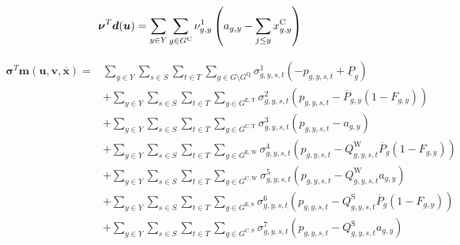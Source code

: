 \documentclass{article}
\newcommand{\sGenerators}{G}
\newcommand{\sGeneratorsExistingThermal}{G^{\mathrm{E,T}}}
\newcommand{\sGeneratorsExistingWind}{G^{\mathrm{E,W}}}
\newcommand{\sGeneratorsExistingSolar}{G^{\mathrm{E,S}}}
\newcommand{\sGeneratorsCandidate}{G^{\mathrm{C}}}
\newcommand{\sGeneratorsCandidateThermal}{G^{\mathrm{C,T}}}
\newcommand{\sGeneratorsCandidateWind}{G^{\mathrm{C,W}}}
\newcommand{\sGeneratorsCandidateSolar}{G^{\mathrm{C,S}}}
\newcommand{\sStorage}{G^{\mathrm{Q}}}
\newcommand{\sYears}{Y}
\newcommand{\sScenarios}{S}
\newcommand{\sIntervals}{T}
\newcommand{\iGenerator}{g}
\newcommand{\iYear}{y}
\newcommand{\iYearAlias}{j}
\newcommand{\iScenario}{s}
\newcommand{\iInterval}{t}
\newcommand{\cPowerOutputMax}[1][\iGenerator,\iYear]{\overline{P}_{#1}}
\newcommand{\cPowerOutputMin}[1][\iGenerator]{\underline{P}_{#1}}
\newcommand{\cCapacityFactorWind}[1][\iGenerator,\iYear,\iScenario,\iInterval]{Q_{#1}^{\mathrm{W}}}
\newcommand{\cCapacityFactorSolar}[1][\iGenerator,\iYear,\iScenario,\iInterval]{Q_{#1}^{\mathrm{S}}}
\newcommand{\cRetirementIndicator}[1][\iGenerator,\iYear]{F_{#1}}
\newcommand{\vInstalledCapacity}[1][\iGenerator,\iYear]{x^{\mathrm{C}}_{#1}}
\newcommand{\vPower}[1][\iGenerator,\iYear,\iScenario,\iInterval]{p_{#1}}
\newcommand{\vInstalledCapacityTotal}[1][\iGenerator,\iYear]{a_{#1}}
\newcommand{\dTotalInstallCapacity}[1][\iGenerator,\iYear]{\nu_{#1}^{1}}
\newcommand{\dMinPowerOutput}[1][\iGenerator,\iYear,\iScenario,\iInterval]{\sigma_{#1}^{1}}
\newcommand{\dMaxPowerOutputExistingThermal}[1][\iGenerator,\iYear,\iScenario,\iInterval]{\sigma_{#1}^{2}}
\newcommand{\dMaxPowerOutputCandidateThermal}[1][\iGenerator,\iYear,\iScenario,\iInterval]{\sigma_{#1}^{3}}
\newcommand{\dMaxPowerOutputWindExisting}[1][\iGenerator,\iYear,\iScenario,\iInterval]{\sigma_{#1}^{4}}
\newcommand{\dMaxPowerOutputWindCandidate}[1][\iGenerator,\iYear,\iScenario,\iInterval]{\sigma_{#1}^{5}}
\newcommand{\dMaxPowerOutputSolarExisting}[1][\iGenerator,\iYear,\iScenario,\iInterval]{\sigma_{#1}^{6}}
\newcommand{\dMaxPowerOutputSolarCandidate}[1][\iGenerator,\iYear,\iScenario,\iInterval]{\sigma_{#1}^{7}}
\begin{document}
\begin{equation}
	\bm{\nu}^{T}\bm{d}(\bm{u}) = \sum\limits_{\iYear \in \sYears} \sum\limits_{\iGenerator \in \sGeneratorsCandidate} \dTotalInstallCapacity \left(\vInstalledCapacityTotal - \sum\limits_{\iYearAlias\leq \iYear} \vInstalledCapacity\right)\\
\end{equation}

\begin{align}
		\bm{\sigma}^{T}\bm{m}(\bm{u}, \bm{v}, \bm{\overline{x}}) = & \sum\limits_{\iYear \in \sYears}\sum\limits_{\iScenario \in \sScenarios}\sum\limits_{\iInterval \in \sIntervals} \sum\limits_{\iGenerator \in \sGenerators \setminus \sStorage} \dMinPowerOutput \left(-\vPower + \cPowerOutputMin\right)\\
		& + \sum\limits_{\iYear \in \sYears}\sum\limits_{\iScenario \in \sScenarios}\sum\limits_{\iInterval \in \sIntervals} \sum\limits_{\iGenerator \in \sGeneratorsExistingThermal} \dMaxPowerOutputExistingThermal \left(\vPower - \cPowerOutputMax \left(1 - \cRetirementIndicator\right)\right)\\
		& + \sum\limits_{\iYear \in \sYears}\sum\limits_{\iScenario \in \sScenarios}\sum\limits_{\iInterval \in \sIntervals} \sum\limits_{\iGenerator \in \sGeneratorsCandidateThermal} \dMaxPowerOutputCandidateThermal \left(\vPower - \vInstalledCapacityTotal\right)\\
		& + \sum\limits_{\iYear \in \sYears}\sum\limits_{\iScenario \in \sScenarios}\sum\limits_{\iInterval \in \sIntervals} \sum\limits_{\iGenerator \in \sGeneratorsExistingWind} \dMaxPowerOutputWindExisting \left(\vPower - \cCapacityFactorWind \cPowerOutputMax[\iGenerator] \left(1 - \cRetirementIndicator\right) \right)\\
		& + \sum\limits_{\iYear \in \sYears}\sum\limits_{\iScenario \in \sScenarios}\sum\limits_{\iInterval \in \sIntervals} \sum\limits_{\iGenerator \in \sGeneratorsCandidateWind} \dMaxPowerOutputWindCandidate \left(\vPower - \cCapacityFactorWind \vInstalledCapacityTotal\right)\\
		& + \sum\limits_{\iYear \in \sYears}\sum\limits_{\iScenario \in \sScenarios}\sum\limits_{\iInterval \in \sIntervals} \sum\limits_{\iGenerator \in \sGeneratorsExistingSolar} \dMaxPowerOutputSolarExisting \left(\vPower - \cCapacityFactorSolar \cPowerOutputMax[\iGenerator] \left(1 - \cRetirementIndicator\right)\right)\\
		& + \sum\limits_{\iYear \in \sYears}\sum\limits_{\iScenario \in \sScenarios}\sum\limits_{\iInterval \in \sIntervals} \sum\limits_{\iGenerator \in \sGeneratorsCandidateSolar} \dMaxPowerOutputSolarCandidate \left(\vPower - \cCapacityFactorSolar \vInstalledCapacityTotal\right)\\

\end{align}
\end{document}

